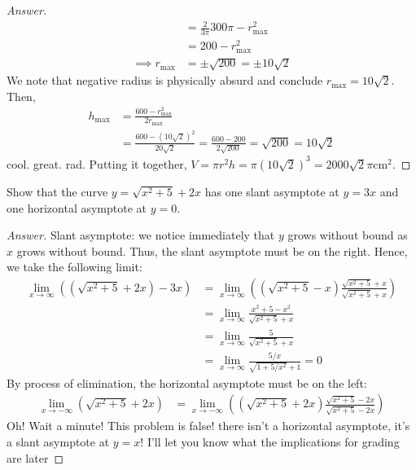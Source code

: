 \documentclass[11pt]{exam}
\begin{document}
\begin{questions}
\begin{proof}[Answer]
\begin{align*}
		&=\frac{2}{3\pi}300\pi-r_{\max}^2\\
		&=200-r_{\max}^2\\
		\implies r_\max&=\pm \sqrt{200}=\pm10\sqrt{2}
	\end{align*}
	We note that negative radius is physically absurd and conclude $r_{\max}=10\sqrt{2}$. Then, \begin{align*}h_\max&=\frac{600-r_{\max}^2}{2r_{\max}}\\&=\frac{600-(10\sqrt{2})^2}{20\sqrt{2}}=\frac{600-200}{2\sqrt{200}}=\sqrt{200}=10\sqrt{2}\end{align*}
	cool. great. rad. Putting it together, $V=\pi r^2h=\pi(10\sqrt{2})^3=2000\sqrt{2}\pi$cm${}^2$.
\end{proof}
\vskip70mm
\addpoints
\question[3] Show that the curve $y=\sqrt{x^2+5}+2x$ has one slant asymptote at $y = 3x$ and one horizontal asymptote at $y = 0$.
\begin{proof}[Answer]
Slant asymptote: we notice immediately that $y$ grows without bound as $x$ grows without bound. Thus, the slant asymptote must be on the right. Hence, we take the following limit:
\begin{align*}
	\lim_{x\to\infty}\left((\sqrt{x^2+5}+2x)-3x\right)&=\lim_{x\to\infty}\left((\sqrt{x^2+5}-x)\frac{\sqrt{x^2+5}+x}{\sqrt{x^2+5}+x}\right)\\
	&=\lim_{x\to\infty}\frac{x^2+5-x^2}{\sqrt{x^2+5}+x}\\
	&=\lim_{x\to\infty}\frac{5}{\sqrt{x^2+5}+x}\\&=\lim_{x\to\infty}\frac{5/x}{\sqrt{1+5/x^2}+1}=0
\end{align*}
By process of elimination, the horizontal asymptote must be on the left:
\begin{align*}
	\lim_{x\to-\infty}(\sqrt{x^2+5}+2x)&=	\lim_{x\to-\infty}\left((\sqrt{x^2+5}+2x)\frac{\sqrt{x^2+5}-2x}{\sqrt{x^2+5}-2x}\right)
\end{align*}
Oh! Wait a minute! This problem is false! there isn't a horizontal asymptote, it's a slant asymptote at $y=x$! I'll let you know what the implications for grading are later\textellipsis
\end{proof}


\end{questions}
\end{document}
